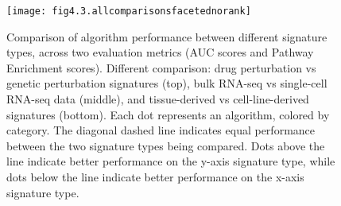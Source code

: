 \begin{figure}[htbp]
    \centering
    \texttt{[image: fig4.3.allcomparisonsfacetednorank]}
    \caption[Comparison of algorithm performance between different signature types.]{Comparison of algorithm performance between different signature types, across two evaluation metrics (\gls{AUC} scores and Pathway Enrichment scores). Different comparison: drug perturbation vs genetic perturbation signatures (top), bulk RNA-seq vs single-cell RNA-seq data (middle), and tissue-derived vs cell-line-derived signatures (bottom). Each dot represents an algorithm, colored by category. The diagonal dashed line indicates equal performance between the two signature types being compared. Dots above the line indicate better performance on the y-axis signature type, while dots below the line indicate better performance on the x-axis signature type.}
    \label{fig:fig4.3.allcomparisonsfacetednorank}
\end{figure}


